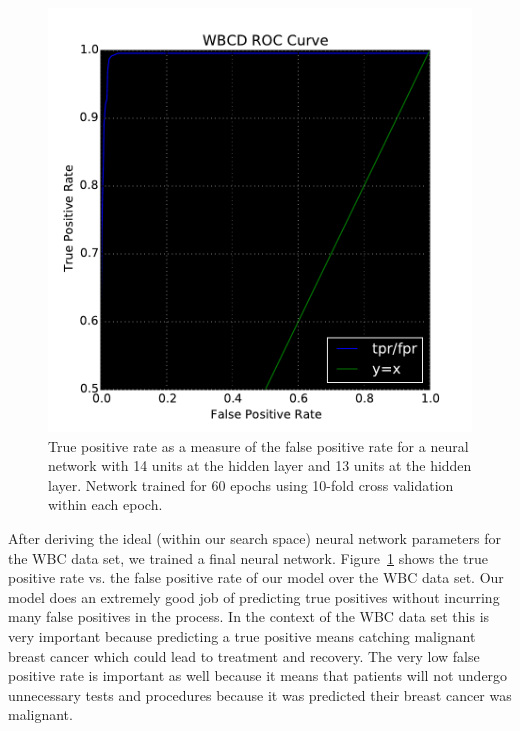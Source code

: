 \begin{figure}[t]

\centering
\includegraphics[width=0.95\columnwidth]{figs/wbcd_roc}
\caption {True positive rate as a measure of the false positive rate for a neural network with 14 units at the  hidden layer and 13 units at the  hidden layer. Network trained for 60 epochs using 10-fold cross validation within each epoch.}
\label{fig:wbcd_roc}

\end{figure}

After deriving the ideal (within our search space) neural network parameters for the WBC data set, we trained a final neural network.
Figure~\ref{fig:wbcd_roc} shows the true positive rate vs. the false positive rate of our model over the WBC data set.
Our model does an extremely good job of predicting true positives without incurring many false positives in the process.
In the context of the WBC data set this is very important because predicting a true positive means catching malignant breast cancer which could lead to treatment and recovery.
The very low false positive rate is important as well because it means that patients will not undergo unnecessary tests and procedures because it was predicted their breast cancer was malignant.

